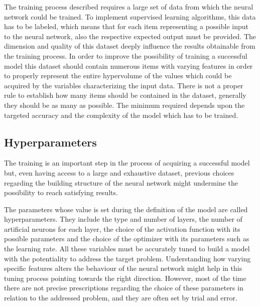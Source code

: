 \documentclass[a4paper,10pt]{report}
\begin{document}
The training process described requires a large set of data from which 
the neural network could be trained.
To implement supervised learning algorithms, this data has to be labeled, which means that
for each item representing a possible input to the neural network, also the respective 
expected output must be provided. 
The dimension and quality of this 
dataset deeply influence the results obtainable from the training process.
In order to improve the possibility of training a successful model 
this dataset should contain numerous items with varying features in order
to properly represent the entire hypervolume of the values which could be acquired by the variables
characterizing the input data.
There is not a proper rule to establish how many items should be contained 
in the dataset, generally they should be as many as possible.
The minimum required depends upon the targeted accuracy and the complexity of
the model which has to be trained.


\subsection{Hyperparameters}

The training is an important step in the process of acquiring a successful model but, even
having access to a large and exhaustive dataset, previous choices regarding the 
building structure of the neural network might undermine the possibility to reach
satisfying results.

The parameters whose value is set during the definition of the model are called hyperparameters.
They include the type and number of layers, the number of artificial neurons for each layer, 
the choice of the activation function with its possible parameters and the choice of the optimizer with
its parameters such as the learning rate.
All these variables must be accurately tuned to build a model with the potentiality 
to address the target problem. Understanding how varying specific features alters the behaviour of the neural 
network might help in this tuning process pointing towards the right direction.
However, most of the time there are not precise prescriptions regarding the choice of these parameters
in relation to the addressed problem, and they are often set by trial and error.
\end{document}
